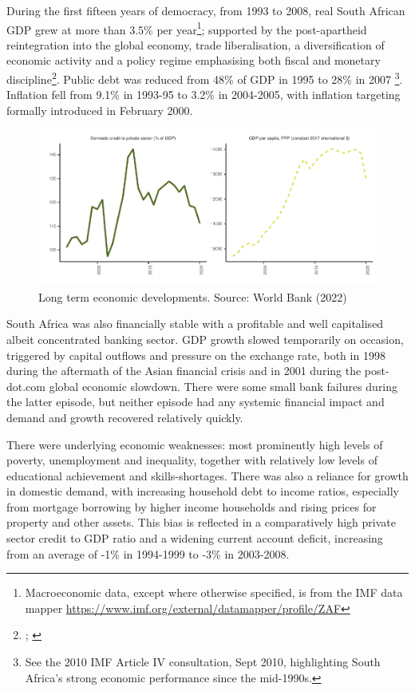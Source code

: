 \documentclass[
]{article}
\begin{document}
During the first fifteen years of democracy, from 1993 to 2008, real South African GDP grew at more than 3.5\% per year\footnote{Macroeconomic data, except where otherwise specified, is from the IMF data mapper \url{https://www.imf.org/external/datamapper/profile/ZAF}}; supported by the post-apartheid reintegration into the global economy, trade liberalisation, a diversification of economic activity and a policy regime emphasising both fiscal and monetary discipline\footnote{\citet{nowak2005first}; \citet{nowak2006post}}. Public debt was reduced from 48\% of GDP in 1995 to 28\% in 2007 \footnote{See the 2010 IMF Article IV consultation, Sept 2010, highlighting South Africa's strong economic performance since the mid-1990s.}. Inflation fell from 9.1\% in 1993-95 to 3.2\% in 2004-2005, with inflation targeting formally introduced in February 2000.

\begin{figure}[H]

\includegraphics{Bank_capital_and_bank_lending_files/figure-latex/unnamed-chunk-1-1} \hfill{}

\caption{Long term economic developments. Source: World Bank (2022)}\label{fig:unnamed-chunk-1}
\end{figure}

South Africa was also financially stable with a profitable and well capitalised albeit concentrated banking sector. GDP growth slowed temporarily on occasion, triggered by capital outflows and pressure on the exchange rate, both in 1998 during the aftermath of the Asian financial crisis and in 2001 during the post-dot.com global economic slowdown. There were some small bank failures during the latter episode, but neither episode had any systemic financial impact and demand and growth recovered relatively quickly.

There were underlying economic weaknesses: most prominently high levels of poverty, unemployment and inequality, together with relatively low levels of educational achievement and skills-shortages. There was also a reliance for growth in domestic demand, with increasing household debt to income ratios, especially from mortgage borrowing by higher income households and rising prices for property and other assets. This bias is reflected in a comparatively high private sector credit to GDP ratio and a widening current account deficit, increasing from an average of -1\% in 1994-1999 to -3\% in 2003-2008.
\end{document}
